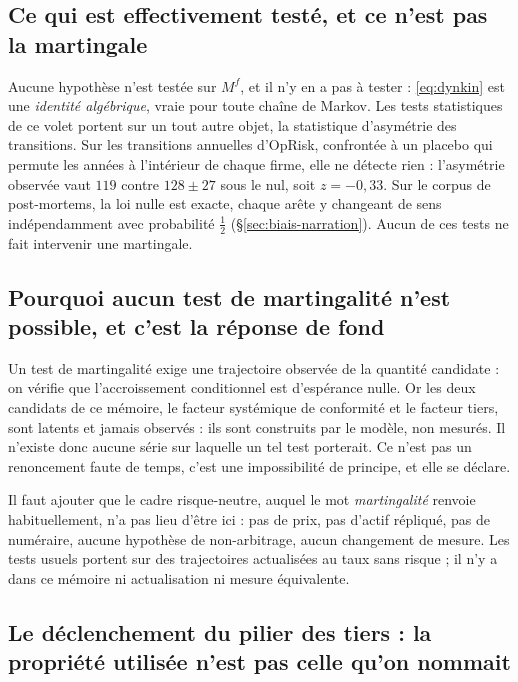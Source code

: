 \subsection*{Ce qui est effectivement testé, et ce n'est pas la martingale}

Aucune hypothèse n'est testée sur $M^f$, et il n'y en a pas à tester : \eqref{eq:dynkin} est une
\emph{identité algébrique}, vraie pour toute chaîne de Markov. Les tests statistiques de ce
volet portent sur un tout autre objet, la statistique d'asymétrie des transitions. Sur les
transitions annuelles d'OpRisk, confrontée à un placebo qui permute les années à l'intérieur de
chaque firme, elle ne détecte rien : l'asymétrie observée vaut $119$ contre $128 \pm 27$ sous le
nul, soit $z = -0{,}33$. Sur le corpus de post-mortems, la loi nulle est exacte, chaque arête y
changeant de sens indépendamment avec probabilité $\tfrac12$ (\S\ref{sec:biais-narration}). Aucun
de ces tests ne fait intervenir une martingale.

\subsection*{Pourquoi aucun test de martingalité n'est possible, et c'est la réponse de fond}

Un test de martingalité exige une trajectoire observée de la quantité candidate : on
vérifie que l'accroissement conditionnel est d'espérance nulle. Or les deux candidats de ce
mémoire, le facteur systémique de conformité et le facteur tiers, sont latents et jamais
observés : ils sont construits par le modèle, non mesurés. Il n'existe donc aucune série sur
laquelle un tel test porterait. Ce n'est pas un renoncement faute de temps, c'est une
impossibilité de principe, et elle se déclare.

Il faut ajouter que le cadre risque-neutre, auquel le mot \emph{martingalité} renvoie
habituellement, n'a pas lieu d'être ici : pas de prix, pas d'actif répliqué, pas de numéraire,
aucune hypothèse de non-arbitrage, aucun changement de mesure. Les tests usuels portent sur des
trajectoires actualisées au taux sans risque ; il n'y a dans ce mémoire ni actualisation ni
mesure équivalente.

\subsection*{Le déclenchement du pilier des tiers : la propriété utilisée n'est pas celle qu'on
nommait}

